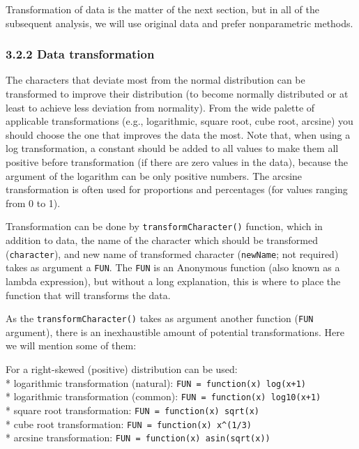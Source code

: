 \documentclass[
]{article}
\begin{document}
Transformation of data is the matter of the next section, but in all of
the subsequent analysis, we will use original data and prefer
nonparametric methods.

\hypertarget{data-transformation}{%
\subsubsection{3.2.2 Data transformation}\label{data-transformation}}

The characters that deviate most from the normal distribution can be
transformed to improve their distribution (to become normally
distributed or at least to achieve less deviation from normality). From
the wide palette of applicable transformations (e.g., logarithmic,
square root, cube root, arcsine) you should choose the one that improves
the data the most. Note that, when using a log transformation, a
constant should be added to all values to make them all positive before
transformation (if there are zero values in the data), because the
argument of the logarithm can be only positive numbers. The arcsine
transformation is often used for proportions and percentages (for values
ranging from 0 to 1).

Transformation can be done by \texttt{transformCharacter()} function,
which in addition to data, the name of the character which should be
transformed (\texttt{character}), and new name of transformed character
(\texttt{newName}; not required) takes as argument a \texttt{FUN}. The
\texttt{FUN} is an Anonymous function (also known as a lambda
expression), but without a long explanation, this is where to place the
function that will transforms the data.

As the \texttt{transformCharacter()} takes as argument another function
(\texttt{FUN} argument), there is an inexhaustible amount of potential
transformations. Here we will mention some of them:

For a right-skewed (positive) distribution can be used:\\
* logarithmic transformation (natural):
\texttt{FUN\ =\ function(x)\ log(x+1)}\\
* logarithmic transformation (common):
\texttt{FUN\ =\ function(x)\ log10(x+1)}\\
* square root transformation: \texttt{FUN\ =\ function(x)\ sqrt(x)}\\
* cube root transformation: \texttt{FUN\ =\ function(x)\ x\^{}(1/3)}\\
* arcsine transformation: \texttt{FUN\ =\ function(x)\ asin(sqrt(x))}
\end{document}

